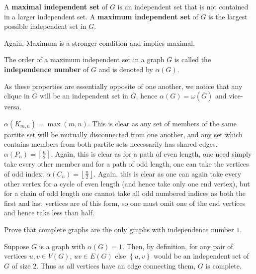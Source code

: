  \begin{definition}
 	A \textbf{maximal independent set} of $G$ is an independent set that is not contained in a larger independent set. A \textbf{maximum independent set} of $G$ is the largest possible independent set in $G$.
 \end{definition}
 \begin{remark}
 	Again, Maximum is a stronger condition and implies maximal.
 \end{remark}
 \begin{definition}
	 The order of a maximum independent set in a graph $G$ is called the \textbf{independence number} of $G$ and is denoted by $\alpha \left( G \right) $.
 \end{definition}
 \begin{remark}
	 As these properties are essentially opposite of one another, we notice that any clique in $G$ will be an independent set in $\overline{G}$, hence $\alpha \left( G \right) = \omega \left( \overline{G} \right) $ and vice-versa.
 \end{remark}
 \begin{problem}
	 $\alpha \left( K_{m, n} \right) = \max \left( m, n \right)$. This is clear as any set of members of the same partite set will be mutually disconnected from one another, and any set which contains members from both partite sets necessarily has shared edges.\\
	 $\alpha \left( P_{n} \right)= \left\lceil \frac{n}{2} \right\rceil  $. Again, this is clear as for a path of even length, one need simply take every other member and for a path of odd length, one can take the vertices of odd index.
	 $\alpha \left( C_{n} \right)= \left\lfloor \frac{n}{2} \right\rfloor $. Again, this is clear as one can again take every other vertex for a cycle of even length (and hence take only one end vertex), but for a chain of odd length one cannot take all odd numbered indices as both the first and last vertices are of this form, so one must omit one of the end vertices and hence take less than half.
 \end{problem}
\begin{problem}
	Prove that complete graphs are the only graphs with independence number $1$.
\end{problem}
\begin{solution}
	Suppose $G$ is a  graph with $\alpha  \left( G \right) = 1$. Then, by definition, for any pair of vertices $u, v \in V\left( G \right) $, $uv \in E\left( G \right) $ else $\left\{ u, v \right\} $ would be an independent set of $G$ of size $2$. Thus as all vertices have an edge connecting them,  $G$ is complete.
\end{solution}
